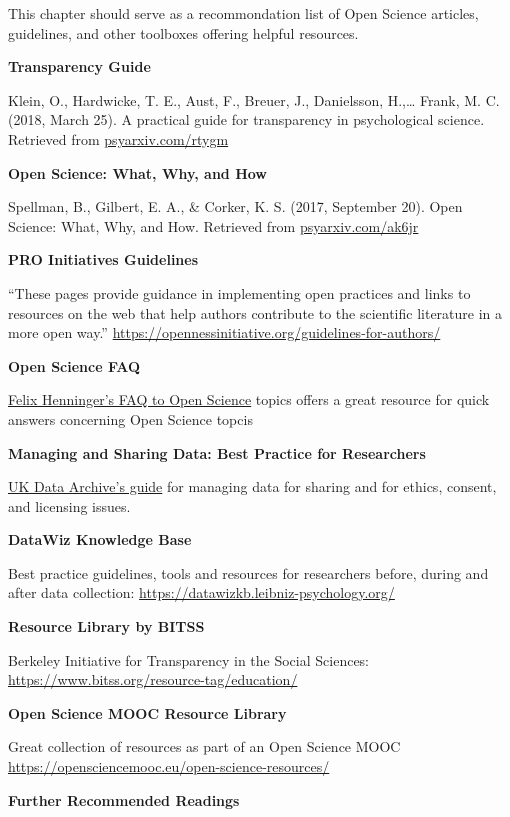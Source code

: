 \documentclass[12pt,]{report}
\begin{document}
This chapter should serve as a recommondation list of Open Science
articles, guidelines, and other toolboxes offering helpful resources.

\textbf{Transparency Guide}

Klein, O., Hardwicke, T. E., Aust, F., Breuer, J., Danielsson,
H.,\ldots{} Frank, M. C. (2018, March 25). A practical guide for
transparency in psychological science. Retrieved from
\href{http://psyarxiv.com/rtygm}{psyarxiv.com/rtygm}

\textbf{Open Science: What, Why, and How}

Spellman, B., Gilbert, E. A., \& Corker, K. S. (2017, September 20).
Open Science: What, Why, and How. Retrieved from
\href{http://psyarxiv.com/ak6jr}{psyarxiv.com/ak6jr}

\textbf{PRO Initiatives Guidelines}

``These pages provide guidance in implementing open practices and links
to resources on the web that help authors contribute to the scientific
literature in a more open way.''
\url{https://opennessinitiative.org/guidelines-for-authors/}

\textbf{Open Science FAQ}

\href{https://felixhenninger.gitbooks.io/open-science-knowledge-base/content/}{Felix
Henninger's FAQ to Open Science} topics offers a great resource for
quick answers concerning Open Science topcis

\textbf{Managing and Sharing Data: Best Practice for Researchers}

\href{http://www.data-archive.ac.uk/media/2894/managingsharing.pdf}{UK
Data Archive's guide} for managing data for sharing and for ethics,
consent, and licensing issues.

\textbf{DataWiz Knowledge Base}

Best practice guidelines, tools and resources for researchers before,
during and after data collection:
\url{https://datawizkb.leibniz-psychology.org/}

\textbf{Resource Library by BITSS}

Berkeley Initiative for Transparency in the Social Sciences:
\url{https://www.bitss.org/resource-tag/education/}

\textbf{Open Science MOOC Resource Library}

Great collection of resources as part of an Open Science MOOC
\url{https://opensciencemooc.eu/open-science-resources/}

\textbf{Further Recommended Readings}
\end{document}
